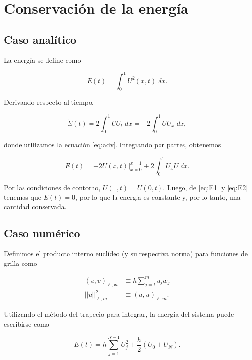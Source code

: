 \documentclass[12pt]{article}
\begin{document}
\section{Conservaci\'on de la energ\'ia}

\subsection{Caso anal\'itico}

La energ\'ia se define como 

\begin{equation}
E(t) = \int_0^1 U^2(x,t)\; dx.
\end{equation}

Derivando respecto al tiempo,

\begin{equation} \label{eq:E1}
\dot{E}(t) = 2 \int_0^1 U U_t\; dx = -2 \int_0^1 U U_x \; dx,
\end{equation}

donde utilizamos la ecuaci\'on \ref{eq:adv}. Integrando por partes, obtenemos

\begin{equation} \label{eq:E2}
\dot{E}(t) = -2 U(x,t)\big|_{x=0}^{x=1} + 2 \int_0^1 U_x U \;dx.
\end{equation}

Por las condiciones de contorno, $U(1, t) = U(0,t)$. Luego, de \ref{eq:E1} y \ref{eq:E2} tenemos que $\dot{E}(t) = 0$, por lo que la energ\'ia es constante y, por lo tanto, una cantidad conservada.

\subsection{Caso num\'erico}

Definimos el producto interno eucl\'ideo (y su respectiva norma) para funciones de grilla como

\begin{align}
(u,v)_{\ell, m} &\equiv h \sum_{j=l}^m u_j w_j \\
||u||_{\ell, m}^2 &\equiv (u,u)_{\ell, m}.
\end{align}

Utilizando el m\'etodo del trapecio para integrar, la energ\'ia del sistema puede escribirse como

\begin{equation}
E(t) = h\sum_{j=1}^{N-1} U_j^2 + \dfrac{h}{2} (U_0 + U_N).
\end{equation}
\end{document}
